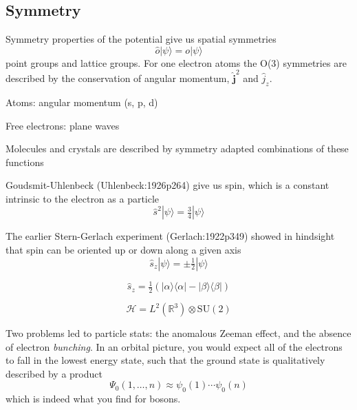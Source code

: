 \subsection{Symmetry}

Symmetry properties of the potential give us spatial symmetries
\begin{equation}
    \hat{o}
    |\psi\rangle
    =
    o
    |\psi\rangle
\end{equation}
point groups and lattice groups.
For one electron atoms the O(3) symmetries are described by the conservation of
angular momentum, \(\hat{\mathbf{j}}^2\) and \(\hat{j}_z\).

\noindent
Atoms: angular momentum (s, p, d)

\noindent
Free electrons: plane waves

\noindent
Molecules and crystals are described by symmetry adapted combinations of these
functions


Goudsmit-Uhlenbeck (Uhlenbeck:1926p264) give us spin, which is a constant intrinsic to the electron
as a particle
\begin{equation}
    \hat{s}^2
    |\psi\rangle
    =
    \tfrac{3}{4}
    |\psi\rangle
\end{equation}

The earlier Stern-Gerlach experiment (Gerlach:1922p349) showed in hindsight that
spin can be oriented up or down along a given axis
\begin{equation}
    \hat{s}_z
    |\psi\rangle
    =
    \pm
    \tfrac{1}{2}
    |\psi\rangle
\end{equation}

\begin{equation}
    \hat{s}_z
    =
    \tfrac{1}{2}
    (
        |\alpha\rangle\langle\alpha|
        -
        |\beta\rangle\langle\beta|
    )
\end{equation}

\begin{equation}
    \mathcal{H}
    =
    L^2(\mathbb{R}^3)
    \otimes
    \mathrm{SU}(2)
\end{equation}


Two problems led to particle stats: the anomalous Zeeman effect, and the absence
of electron {\itshape bunching}.
In an orbital picture, you would expect all of the electrons to fall in the
lowest energy state, such that the ground state is qualitatively described by a
product
\begin{equation}
    \Psi_0(1,\ldots,n)
    \approx
    \psi_0(1)
    \cdots
    \psi_0(n)
\end{equation}
which is indeed what you find for bosons.

